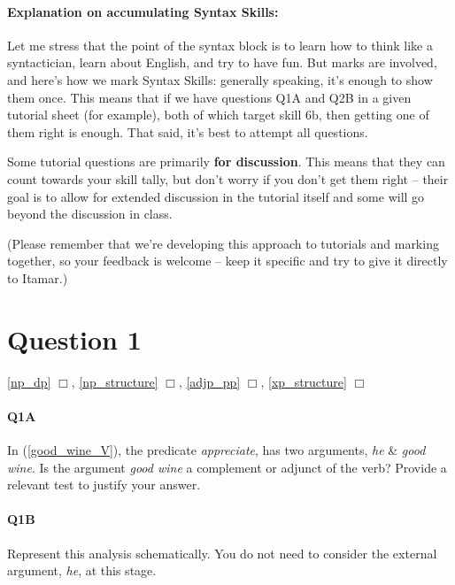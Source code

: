 \documentclass{article}
\begin{document}
\pagestyle{empty}
\maketitle
\subtitle{Tutorial Week 7: Topics 7, 8 \& 9}

\paragraph{Explanation on accumulating Syntax Skills:} Let me stress that the point of the syntax block is to learn how to think like a syntactician, learn about English, and try to have fun. But marks are involved, and here's how we mark Syntax Skills: generally speaking, it's enough to show them once. This means that if we have questions Q1A and Q2B in a given tutorial sheet (for example), both of which target skill 6b, then getting one of them right is enough. That said, it's best to attempt all questions.

Some tutorial questions are primarily \textbf{for discussion}. This means that they can count towards your skill tally, but don't worry if you don't get them right -- their goal is to allow for extended discussion in the tutorial itself and some will go beyond the discussion in class.

(Please remember that we're developing this approach to tutorials and marking together, so your feedback is welcome -- keep it specific and try to give it directly to Itamar.)

\section*{Question 1}%
\hfill{} \ref{np_dp} $\Box$,
\ref{np_structure} $\Box$,
\ref{adjp_pp} $\Box$,
\ref{xp_structure} $\Box$%

\paragraph{Q1A} In (\ref{good_wine_V}), the predicate \emph{appreciate}, has two arguments, \emph{he} \& \emph{good wine}.
Is the argument \emph{good wine} a complement or adjunct of the verb?
Provide a relevant test to justify your answer.
\paragraph{Q1B} Represent this analysis schematically. You do not need to consider the external argument, \emph{he}, at this stage.
\end{document}
